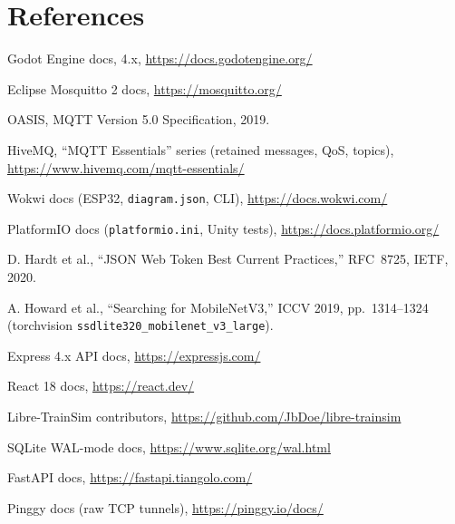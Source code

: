 \documentclass[10pt,a4paper,twocolumn]{article}
\newcommand{\sect}[1]{\section{#1}}
\begin{document}
\sect{References}
{\scriptsize
\begin{enumerate}[itemsep=0.5pt,topsep=1pt,label={[\arabic*]}]
\item Godot Engine docs, 4.x, \url{https://docs.godotengine.org/}
\item Eclipse Mosquitto 2 docs, \url{https://mosquitto.org/}
\item OASIS, MQTT Version 5.0 Specification, 2019.
\item HiveMQ, ``MQTT Essentials'' series (retained messages, QoS, topics), \url{https://www.hivemq.com/mqtt-essentials/}
\item Wokwi docs (ESP32, \texttt{diagram.json}, CLI), \url{https://docs.wokwi.com/}
\item PlatformIO docs (\texttt{platformio.ini}, Unity tests), \url{https://docs.platformio.org/}
\item D. Hardt et al., ``JSON Web Token Best Current Practices,'' RFC~8725, IETF, 2020.
\item A. Howard et al., ``Searching for MobileNetV3,'' ICCV 2019, pp.~1314--1324 (torchvision \texttt{ssdlite320\_mobilenet\_v3\_large}).
\item Express 4.x API docs, \url{https://expressjs.com/}
\item React 18 docs, \url{https://react.dev/}
\item Libre-TrainSim contributors, \url{https://github.com/JbDoe/libre-trainsim}
\item SQLite WAL-mode docs, \url{https://www.sqlite.org/wal.html}
\item FastAPI docs, \url{https://fastapi.tiangolo.com/}
\item Pinggy docs (raw TCP tunnels), \url{https://pinggy.io/docs/}
\end{enumerate}
}
\end{document}
